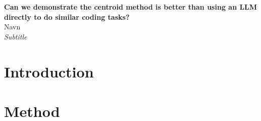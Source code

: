 \documentclass[11pt,a4paper,oldfontcommands]{memoir}
\begin{document}
\begin{center}
    \vspace{2cm}
    \Huge{\textbf{Can we demonstrate the centroid method is better than using an LLM directly to do similar coding tasks? }}\\
    \vspace{0.6cm}
    \LARGE{Navn}\\
    \vspace{0.25cm}
    \LARGE{\textit{Subtitle}}\\
\end{center}

\section*{Introduction}

\section*{Method}
\end{document}
